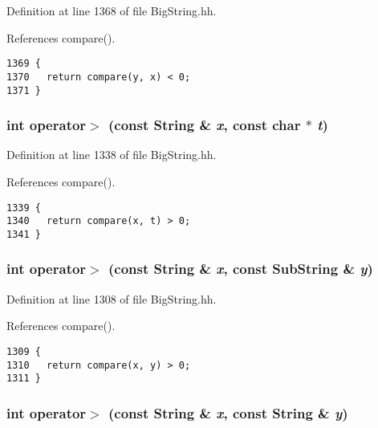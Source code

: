 Definition at line 1368 of file Big\-String.hh.

References compare().



\footnotesize\begin{verbatim}1369 {
1370   return compare(y, x) < 0;
1371 }
\end{verbatim}\normalsize 
{}
\subsubsection{\setlength{\rightskip}{0pt plus 5cm}int operator$>$ (const {\bf String} \& {\em x}, const char $\ast$ {\em t})\hspace{0.3cm}{\tt  [inline]}}\label{BigString_8hh_a100}




Definition at line 1338 of file Big\-String.hh.

References compare().



\footnotesize\begin{verbatim}1339 {
1340   return compare(x, t) > 0; 
1341 }
\end{verbatim}\normalsize 
{}
\subsubsection{\setlength{\rightskip}{0pt plus 5cm}int operator$>$ (const {\bf String} \& {\em x}, const {\bf Sub\-String} \& {\em y})\hspace{0.3cm}{\tt  [inline]}}\label{BigString_8hh_a94}




Definition at line 1308 of file Big\-String.hh.

References compare().



\footnotesize\begin{verbatim}1309 {
1310   return compare(x, y) > 0; 
1311 }
\end{verbatim}\normalsize 
{}
\subsubsection{\setlength{\rightskip}{0pt plus 5cm}int operator$>$ (const {\bf String} \& {\em x}, const {\bf String} \& {\em y})\hspace{0.3cm}{\tt  [inline]}}\label{BigString_8hh_a88}





